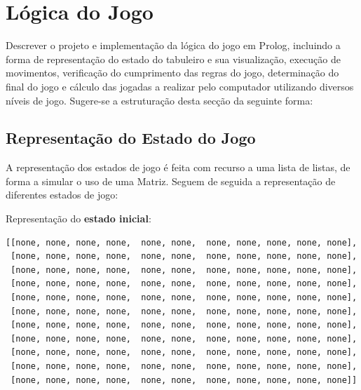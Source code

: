 \documentclass[a4paper]{article}
\begin{document}
\section{Lógica do Jogo}

Descrever o projeto e implementação da lógica do jogo em Prolog, incluindo a forma de representação do estado do tabuleiro e sua visualização, execução de movimentos, verificação do cumprimento das regras do jogo, determinação do final do jogo e cálculo das jogadas a realizar pelo computador utilizando diversos níveis de jogo. Sugere-se a estruturação desta secção da seguinte forma:

\subsection{Representação do Estado do Jogo}

A representação dos estados de jogo é feita com recurso a uma lista de listas, de forma a simular o uso de uma Matriz. Seguem de seguida a representação de diferentes estados de jogo:\newline


Representação do \textbf{estado inicial}:

\begin{small}
\begin{lstlisting}
[[none, none, none, none,  none, none,  none, none, none, none, none],
 [none, none, none, none,  none, none,  none, none, none, none, none],
 [none, none, none, none,  none, none,  none, none, none, none, none],
 [none, none, none, none,  none, none,  none, none, none, none, none],
 [none, none, none, none,  none, none,  none, none, none, none, none],
 [none, none, none, none,  none, none,  none, none, none, none, none],
 [none, none, none, none,  none, none,  none, none, none, none, none],
 [none, none, none, none,  none, none,  none, none, none, none, none],
 [none, none, none, none,  none, none,  none, none, none, none, none],
 [none, none, none, none,  none, none,  none, none, none, none, none],
 [none, none, none, none,  none, none,  none, none, none, none, none]]
\end{lstlisting}
\end{small}
\end{document}
